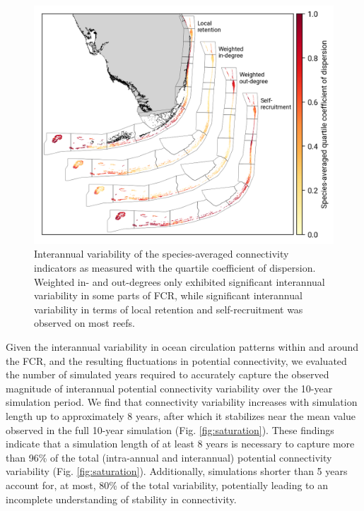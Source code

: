 \documentclass[preprint,12pt,authoryear]{elsarticle}
\begin{document}
	\begin{figure}
		\centering
		\includegraphics[width=\textwidth]{figures/species_averaged_quartile_coefficient_of_dispersion.png}
		\caption{Interannual variability of the species-averaged connectivity indicators as measured with the quartile coefficient of dispersion. Weighted in- and out-degrees only exhibited significant interannual variability in some parts of FCR, while significant interannual variability in terms of local retention and self-recruitment was observed on most reefs.
		}\label{fig:variability}
		
	\end{figure}
	
	Given the interannual variability in ocean circulation patterns within and around the FCR, and the resulting fluctuations in potential connectivity, we evaluated the number of simulated years required to accurately capture the observed magnitude of interannual potential connectivity variability over the 10-year simulation period. We find that connectivity variability increases with simulation length up to approximately 8 years, after which it stabilizes near the mean value observed in the full 10-year simulation (Fig. \ref{fig:saturation}). These findings indicate that a simulation length of at least 8 years is necessary to capture more than 96\% of the total (intra-annual and interannual) potential connectivity variability (Fig. \ref{fig:saturation}). Additionally, simulations shorter than 5 years account for, at most, 80\% of the total variability, potentially leading to an incomplete understanding of stability in connectivity.
	
\end{document}
